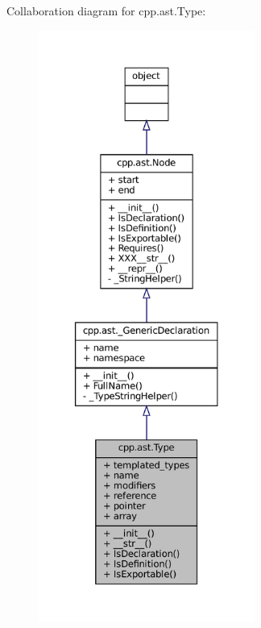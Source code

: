 Collaboration diagram for cpp.\+ast.\+Type\+:
\nopagebreak
\begin{figure}[H]
\begin{center}
\leavevmode
\includegraphics[height=550pt]{classcpp_1_1ast_1_1Type__coll__graph}
\end{center}
\end{figure}
